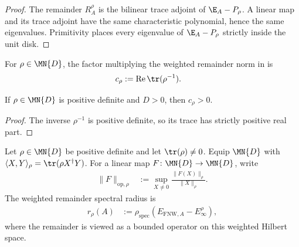 \begin{proof}
    \leanok
    The remainder $R_A^\rho$ is the bilinear trace adjoint of
    $\E_A-P_\rho$.  A linear map and its trace adjoint have the same
    characteristic polynomial, hence the same eigenvalues.  Primitivity places
    every eigenvalue of $\E_A-P_\rho$ strictly inside the unit disk.
\end{proof}

\begin{definition}
    \label{def:fnw_trace_inverse_factor}
    \leanok
    For $\rho\in\MN{D}$, the factor multiplying the weighted remainder norm in
    \cite[Equations~(5.9)--(5.10)]{Fannes1992Finitely} is
    \begin{align}
        c_\rho
         & :=\operatorname{Re}\tr(\rho^{-1}).
        \label{eq:fnw_trace_inverse_factor}
    \end{align}
\end{definition}

\begin{lemma}
    \label{thm:fnw_trace_inverse_factor_pos}
    \leanok
    If $\rho\in\MN{D}$ is positive definite and $D>0$, then $c_\rho>0$.
\end{lemma}

\begin{proof}
    \leanok
    The inverse $\rho^{-1}$ is positive definite, so its trace has strictly
    positive real part.
\end{proof}

\begin{definition}
    \label{def:fnw_weighted_remainder_data}
    \leanok
    Let $\rho\in\MN{D}$ be positive definite and let $\tr(\rho)\neq0$.
    Equip $\MN{D}$ with
    $\langle X,Y\rangle_\rho=\tr(\rho X^\dagger Y)$.  For a linear map
    $F\colon\MN{D}\to\MN{D}$, write
    \begin{align}
        \lVert F\rVert_{\mathrm{op},\rho}
         & :=\sup_{X\neq0}\frac{\lVert F(X)\rVert_\rho}{\lVert X\rVert_\rho}.
        \label{eq:fnw_weighted_operator_norm}
    \end{align}
    The weighted remainder spectral radius is
    \begin{align}
        r_\rho(A)
         & :=\rho_{\mathrm{spec}}\!\left(
        E_{\mathrm{FNW},A}-E_\infty^\rho\right),
        \label{eq:fnw_weighted_remainder_spectral_radius}
    \end{align}
    where the remainder is viewed as a bounded operator on this weighted
    Hilbert space.
\end{definition}

